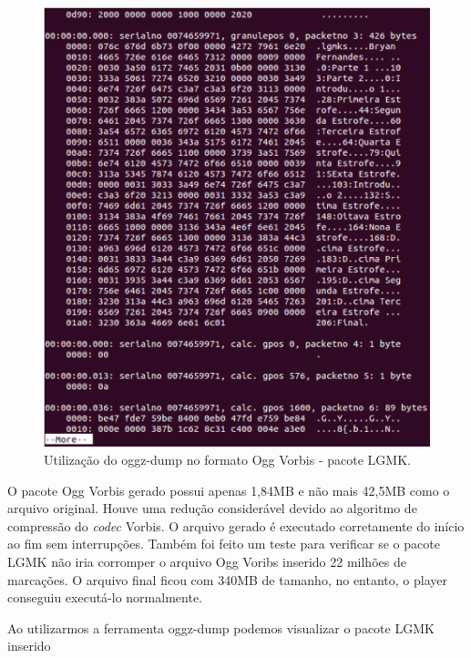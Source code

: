  \begin{figure}[ht]
	\centering
		\includegraphics[keepaspectratio=true,scale=0.3]{figuras/hnblgmkogg.eps}
	\caption{Utilização do oggz-dump no formato Ogg Vorbis - pacote LGMK.}
	\label{lgmk}
\end{figure}

O pacote Ogg Vorbis gerado possui apenas 1,84MB e não mais 42,5MB como o arquivo original. Houve uma redução considerável devido ao algoritmo de compressão do \textit{codec} Vorbis. O arquivo gerado é executado corretamente do início ao fim sem interrupções. Também foi feito um teste para verificar se o pacote LGMK não iria corromper o arquivo Ogg Voribs inserido 22 milhões de marcações. O arquivo final ficou com 340MB de tamanho, no entanto, o player conseguiu executá-lo normalmente.


%





 Ao utilizarmos a ferramenta oggz-dump podemos visualizar o pacote LGMK inserido
